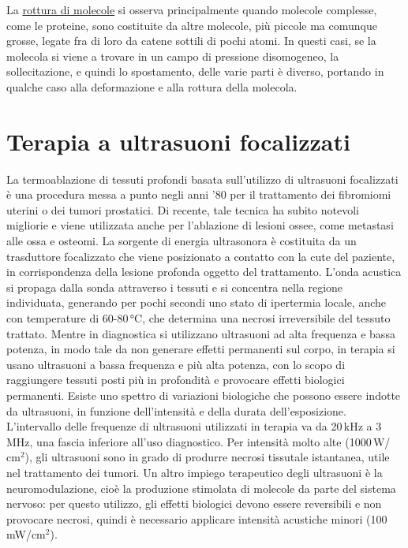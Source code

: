 \documentclass{report}
\numberwithin{equation}{section}
\numberwithin{figure}{section}
\begin{document}
La \underline{rottura di molecole} si osserva principalmente quando molecole complesse, come le proteine, sono costituite da altre molecole, più piccole ma comunque grosse, legate fra di loro da catene sottili di pochi atomi. In questi casi, se la molecola si viene a trovare in un campo di pressione disomogeneo, la sollecitazione, e quindi lo spostamento, delle varie parti è diverso, portando in qualche caso alla deformazione e alla rottura della molecola.

\section{Terapia a ultrasuoni focalizzati}
La termoablazione di tessuti profondi basata sull'utilizzo di ultrasuoni focalizzati è una procedura messa a punto negli anni '80 per il trattamento dei fibromiomi uterini o dei tumori prostatici. Di recente, tale tecnica ha subito notevoli migliorie e viene utilizzata anche per l'ablazione di lesioni ossee, come metastasi alle ossa e osteomi. La sorgente di energia ultrasonora è costituita da un trasduttore focalizzato che viene posizionato a contatto con la cute del paziente, in corrispondenza della lesione profonda oggetto del trattamento. L'onda acustica si propaga dalla sonda attraverso i tessuti e si concentra nella regione individuata, generando per pochi secondi uno stato di ipertermia locale, anche con temperature di 60-80\,°C, che determina una necrosi irreversibile del tessuto trattato. Mentre in diagnostica si utilizzano ultrasuoni ad alta frequenza e bassa potenza, in modo tale da non generare effetti permanenti sul corpo, in terapia si usano ultrasuoni a bassa frequenza e più alta potenza, con lo scopo di raggiungere tessuti posti più in profondità e provocare effetti biologici permanenti. Esiste uno spettro di variazioni biologiche che possono essere indotte da ultrasuoni, in funzione dell'intensità e della durata dell'esposizione. L'intervallo delle frequenze di ultrasuoni utilizzati in terapia va da 20\,kHz a 3\,MHz, una fascia inferiore all'uso diagnostico. Per intensità molto alte (1000\,W/$\text{cm}^2$), gli ultrasuoni sono in grado di produrre necrosi tissutale istantanea, utile nel trattamento dei tumori. Un altro impiego terapeutico degli ultrasuoni è la neuromodulazione, cioè la produzione stimolata di molecole da parte del sistema nervoso: per questo utilizzo, gli effetti biologici devono essere reversibili e non provocare necrosi, quindi è necessario applicare intensità acustiche minori (100\,mW/$\text{cm}^2$).
\end{document}

